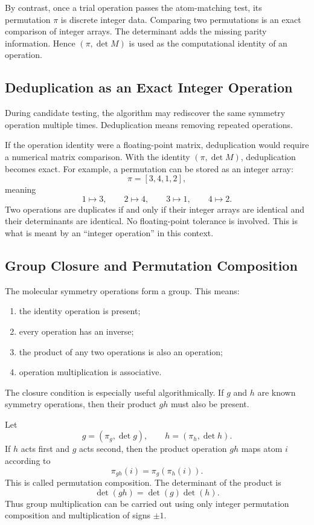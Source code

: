\documentclass[11pt]{article}
\begin{document}
By contrast, once a trial operation passes the atom-matching test, its
permutation \(\pi\) is discrete integer data.  Comparing two permutations is an
exact comparison of integer arrays.  The determinant adds the missing parity
information.  Hence \((\pi,\det M)\) is used as the computational identity of an
operation.

\subsection{Deduplication as an Exact Integer Operation}

During candidate testing, the algorithm may rediscover the same symmetry
operation multiple times.  Deduplication means removing repeated operations.

If the operation identity were a floating-point matrix, deduplication would
require a numerical matrix comparison.  With the identity \((\pi,\det M)\),
deduplication becomes exact.  For example, a permutation can be stored as an
integer array:
\[
    \pi=[3,4,1,2],
\]
meaning
\[
    1\mapsto3,\qquad
    2\mapsto4,\qquad
    3\mapsto1,\qquad
    4\mapsto2.
\]
Two operations are duplicates if and only if their integer arrays are identical
and their determinants are identical.  No floating-point tolerance is involved.
This is what is meant by an ``integer operation'' in this context.

\subsection{Group Closure and Permutation Composition}

The molecular symmetry operations form a group.  This means:
\begin{enumerate}[label=(\alph*)]
    \item the identity operation is present;
    \item every operation has an inverse;
    \item the product of any two operations is also an operation;
    \item operation multiplication is associative.
\end{enumerate}
The closure condition is especially useful algorithmically.  If \(g\) and \(h\)
are known symmetry operations, then their product \(gh\) must also be present.

Let
\[
    g=(\pi_g,\det g),
    \qquad
    h=(\pi_h,\det h).
\]
If \(h\) acts first and \(g\) acts second, then the product operation \(gh\)
maps atom \(i\) according to
\[
    \pi_{gh}(i)=\pi_g(\pi_h(i)).
\]
This is called permutation composition.  The determinant of the product is
\[
    \det(gh)=\det(g)\det(h).
\]
Thus group multiplication can be carried out using only integer permutation
composition and multiplication of signs \(\pm1\).
\end{document}
